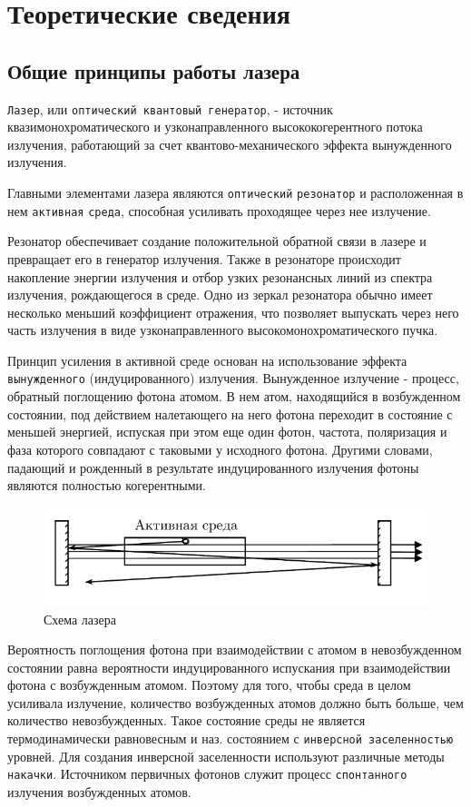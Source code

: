 \documentclass[a4paper,12pt]{article}
\begin{document}
\section{Теоретические сведения}
\subsection{Общие принципы работы лазера}

\texttt{Лазер}, или \texttt{оптический квантовый генератор}, - источник квазимонохроматического и узконаправленного высококогерентного потока излучения, работающий за счет квантово-механического эффекта вынужденного излучения.

Главными элементами лазера являются \texttt{оптический} \texttt{резонатор} и расположенная в нем \texttt{активная} \texttt{среда}, способная усиливать проходящее через нее излучение.

Резонатор обеспечивает создание положительной обратной связи в лазере и превращает его в генератор излучения. Также в резонаторе происходит накопление энергии излучения и отбор узких резонансных линий из спектра излучения, рождающегося в среде. Одно из зеркал резонатора обычно имеет несколько меньший коэффициент отражения, что позволяет выпускать через него часть излучения в виде узконаправленного высокомонохроматического пучка.

Принцип усиления в активной среде основан на использование эффекта \texttt{вынужденного} (индуцированного) излучения. Вынужденное излучение - процесс, обратный поглощению фотона атомом. В нем атом, находящийся в возбужденном состоянии, под действием налетающего на него фотона переходит в состояние с меньшей энергией, испуская при этом еще один фотон, частота, поляризация и фаза которого совпадают с таковыми у исходного фотона. Другими словами, падающий и рожденный в результате индуцированного излучения фотоны являются полностью когерентными.

\begin{figure}[h]
\centering
\includegraphics[width=0.5\linewidth]{img4.png}
\caption{Схема лазера}
\label{img4}
\end{figure}

Вероятность поглощения фотона при взаимодействии с атомом в невозбужденном состоянии равна вероятности индуцированного испускания при взаимодействии фотона с возбужденным атомом. Поэтому для того, чтобы среда в целом усиливала излучение, количество возбужденных атомов должно быть больше, чем количество невозбужденных. Такое состояние среды не является термодинамически равновесным и наз. состоянием с \texttt{инверсной заселенностью} уровней. Для создания инверсной заселенности используют различные методы \texttt{накачки}. Источником первичных фотонов служит процесс \texttt{спонтанного} излучения возбужденных атомов.
\end{document}
